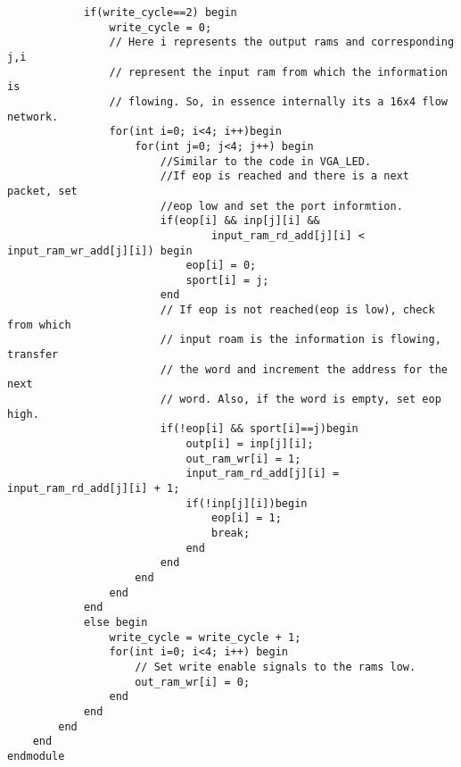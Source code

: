 \documentclass[twoside,12pt,fleqn]{book} %
\begin{document}
\begin{lstlisting}
            if(write_cycle==2) begin
                write_cycle = 0;
                // Here i represents the output rams and corresponding j,i
                // represent the input ram from which the information is
                // flowing. So, in essence internally its a 16x4 flow network.
                for(int i=0; i<4; i++)begin
                    for(int j=0; j<4; j++) begin
                        //Similar to the code in VGA_LED.
                        //If eop is reached and there is a next packet, set
                        //eop low and set the port informtion.
                        if(eop[i] && inp[j][i] && 
                                input_ram_rd_add[j][i] < input_ram_wr_add[j][i]) begin
                            eop[i] = 0;
                            sport[i] = j;
                        end
                        // If eop is not reached(eop is low), check from which
                        // input roam is the information is flowing, transfer
                        // the word and increment the address for the next
                        // word. Also, if the word is empty, set eop high.
                        if(!eop[i] && sport[i]==j)begin
                            outp[i] = inp[j][i];
                            out_ram_wr[i] = 1;
                            input_ram_rd_add[j][i] = input_ram_rd_add[j][i] + 1;
                            if(!inp[j][i])begin
                                eop[i] = 1;
								break;
                            end
                        end
                    end
                end
            end
            else begin
                write_cycle = write_cycle + 1;
                for(int i=0; i<4; i++) begin
                    // Set write enable signals to the rams low.
                    out_ram_wr[i] = 0;
                end
            end
        end
    end
endmodule
\end{lstlisting}
\end{document}
